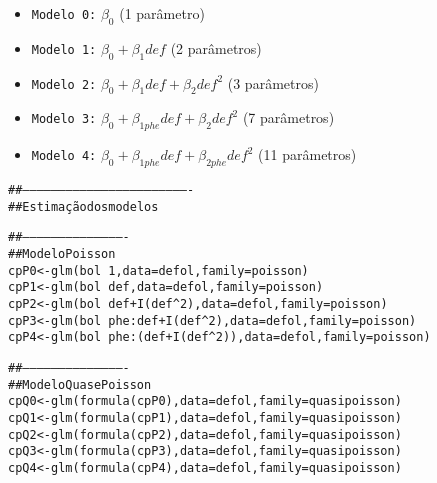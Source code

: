 \documentclass[nohyper, justified, svgnames]{tufte-handout}\usepackage[]{graphicx}\usepackage[]{color}
\makeatletter
\newcommand{\hlnum}[1]{\textcolor[rgb]{0,1,1}{#1}}%
\newcommand{\hlcom}[1]{\textcolor[rgb]{0.314,0.439,0.502}{#1}}%
\newcommand{\hlopt}[1]{\textcolor[rgb]{0.878,0.933,0.878}{#1}}%
\newcommand{\hlstd}[1]{\textcolor[rgb]{0.878,0.933,0.878}{#1}}%
\newcommand{\hlkwb}[1]{\textcolor[rgb]{0.678,0.847,0.902}{#1}}%
\newcommand{\hlkwc}[1]{\textcolor[rgb]{0.8,0.6,1}{#1}}%
\newcommand{\hlkwd}[1]{\textcolor[rgb]{1,0.6,0.6}{#1}}%
\newenvironment{kframe}{%
 \def\at@end@of@kframe{}%
 \ifinner\ifhmode%
  \def\at@end@of@kframe{\end{minipage}}%
  \begin{minipage}{\columnwidth}%
 \fi\fi%
 \def\FrameCommand##1{\hskip\@totalleftmargin \hskip-\fboxsep
 \colorbox{shadecolor}{##1}\hskip-\fboxsep
     \hskip-\linewidth \hskip-\@totalleftmargin \hskip\columnwidth}%
 \MakeFramed {\advance\hsize-\width
   \@totalleftmargin\z@ \linewidth\hsize
   \@setminipage}}%
 {\par\unskip\endMakeFramed%
 \at@end@of@kframe}
\newenvironment{knitrout}{}{} %
\makeatother
\begin{document}
\begin{itemize}
    \item {\tt Modelo 0:} $\beta_0$ (1 parâmetro)
    \item {\tt Modelo 1:} $\beta_0 + \beta_1 def$ (2 parâmetros)
    \item {\tt Modelo 2:} $\beta_0 + \beta_1 def + \beta_2 def^2$
    (3 parâmetros)
    \item {\tt Modelo 3:} $\beta_0 + \beta_{1phe} def + \beta_2 
    def^2$  (7 parâmetros)
    \item {\tt Modelo 4:} $\beta_0 + \beta_{1phe} def + \beta_{2phe}
    def^2$ (11 parâmetros)
\end{itemize}




\begin{knitrout}\scriptsize
{}\color{fgcolor}\begin{kframe}
\begin{alltt}
\hlcom{##----------------------------------------------------------------------}
\hlcom{## Estimação dos modelos}

\hlcom{##-------------------------------------------}
\hlcom{## Modelo Poisson}
\hlstd{cpP0} \hlkwb{<-} \hlkwd{glm}\hlstd{(bol} \hlopt{~} \hlnum{1}\hlstd{,} \hlkwc{data} \hlstd{= defol,} \hlkwc{family} \hlstd{= poisson)}
\hlstd{cpP1} \hlkwb{<-} \hlkwd{glm}\hlstd{(bol} \hlopt{~} \hlstd{def,} \hlkwc{data} \hlstd{= defol,} \hlkwc{family} \hlstd{= poisson)}
\hlstd{cpP2} \hlkwb{<-} \hlkwd{glm}\hlstd{(bol} \hlopt{~} \hlstd{def} \hlopt{+} \hlkwd{I}\hlstd{(def}\hlopt{^}\hlnum{2}\hlstd{),} \hlkwc{data} \hlstd{= defol,} \hlkwc{family} \hlstd{= poisson)}
\hlstd{cpP3} \hlkwb{<-} \hlkwd{glm}\hlstd{(bol} \hlopt{~} \hlstd{phe}\hlopt{:}\hlstd{def} \hlopt{+} \hlkwd{I}\hlstd{(def}\hlopt{^}\hlnum{2}\hlstd{),} \hlkwc{data} \hlstd{= defol,} \hlkwc{family} \hlstd{= poisson)}
\hlstd{cpP4} \hlkwb{<-} \hlkwd{glm}\hlstd{(bol} \hlopt{~} \hlstd{phe}\hlopt{:}\hlstd{(def} \hlopt{+} \hlkwd{I}\hlstd{(def}\hlopt{^}\hlnum{2}\hlstd{)),} \hlkwc{data} \hlstd{= defol,} \hlkwc{family} \hlstd{= poisson)}

\hlcom{##-------------------------------------------}
\hlcom{## Modelo Quase Poisson}
\hlstd{cpQ0} \hlkwb{<-} \hlkwd{glm}\hlstd{(}\hlkwd{formula}\hlstd{(cpP0),} \hlkwc{data} \hlstd{= defol,} \hlkwc{family} \hlstd{= quasipoisson)}
\hlstd{cpQ1} \hlkwb{<-} \hlkwd{glm}\hlstd{(}\hlkwd{formula}\hlstd{(cpP1),} \hlkwc{data} \hlstd{= defol,} \hlkwc{family} \hlstd{= quasipoisson)}
\hlstd{cpQ2} \hlkwb{<-} \hlkwd{glm}\hlstd{(}\hlkwd{formula}\hlstd{(cpP2),} \hlkwc{data} \hlstd{= defol,} \hlkwc{family} \hlstd{= quasipoisson)}
\hlstd{cpQ3} \hlkwb{<-} \hlkwd{glm}\hlstd{(}\hlkwd{formula}\hlstd{(cpP3),} \hlkwc{data} \hlstd{= defol,} \hlkwc{family} \hlstd{= quasipoisson)}
\hlstd{cpQ4} \hlkwb{<-} \hlkwd{glm}\hlstd{(}\hlkwd{formula}\hlstd{(cpP4),} \hlkwc{data} \hlstd{= defol,} \hlkwc{family} \hlstd{= quasipoisson)}


\end{alltt}
\end{kframe}
\end{knitrout}
\end{document}
